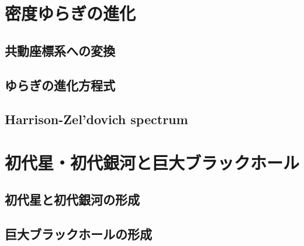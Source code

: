\documentclass[a4paper,papersize,uplatex,dvipdfmx,10pt]{jsarticle}
\begin{document}
\section{密度ゆらぎの進化}
\subsection{共動座標系への変換}

\subsection{ゆらぎの進化方程式}

\subsection{Harrison-Zel'dovich spectrum}

\section{初代星・初代銀河と巨大ブラックホール}
\subsection{初代星と初代銀河の形成}

\subsection{巨大ブラックホールの形成}


%
%
\end{document}
